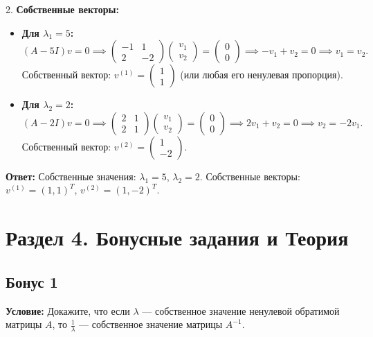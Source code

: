 \documentclass[11pt, a4paper]{article}
\begin{document}
2. \textbf{Собственные векторы:}
\begin{itemize}
\item \textbf{Для $\lambda_1 = 5$:}
$$ (A - 5I)v = 0 \implies \begin{pmatrix} -1 & 1 \\ 2 & -2 \end{pmatrix} \begin{pmatrix} v_1 \\ v_2 \end{pmatrix} = \begin{pmatrix} 0 \\ 0 \end{pmatrix} \implies -v_1 + v_2 = 0 \implies v_1 = v_2. $$
Собственный вектор: $v^{(1)} = \begin{pmatrix} 1 \\ 1 \end{pmatrix}$ (или любая его ненулевая пропорция).

\item \textbf{Для $\lambda_2 = 2$:}
$$ (A - 2I)v = 0 \implies \begin{pmatrix} 2 & 1 \\ 2 & 1 \end{pmatrix} \begin{pmatrix} v_1 \\ v_2 \end{pmatrix} = \begin{pmatrix} 0 \\ 0 \end{pmatrix} \implies 2v_1 + v_2 = 0 \implies v_2 = -2v_1. $$
Собственный вектор: $v^{(2)} = \begin{pmatrix} 1 \\ -2 \end{pmatrix}$.
\end{itemize}

\textbf{Ответ:} Собственные значения: $\lambda_1 = 5$, $\lambda_2 = 2$. Собственные векторы: $v^{(1)} = (1, 1)^T$, $v^{(2)} = (1, -2)^T$.

\newpage

\section{Раздел 4. Бонусные задания и Теория}

\subsection*{Бонус 1}
\textbf{Условие:} Докажите, что если $\lambda$ --- собственное значение ненулевой обратимой матрицы $A$, то $\frac{1}{\lambda}$ --- собственное значение матрицы $A^{-1}$.
\end{document}
